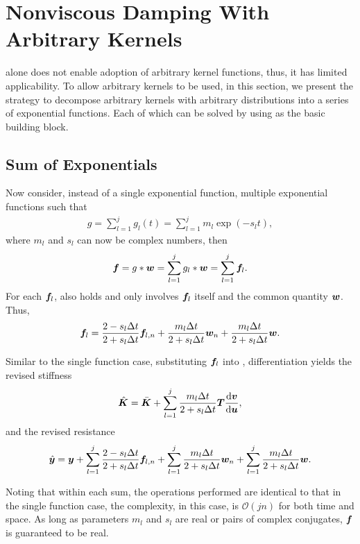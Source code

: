 \section{Nonviscous Damping With Arbitrary Kernels}\label{sec:arbitrary}
 alone does not enable adoption of arbitrary kernel functions, thus, it has limited applicability. To allow arbitrary kernels to be used, in this section, we present the strategy to decompose arbitrary kernels with arbitrary distributions into a series of exponential functions. Each of which can be solved by using  as the basic building block.
\subsection{Sum of Exponentials}
Now consider, instead of a single exponential function, multiple exponential functions such that
\begin{gather}\label{eq:sum_exp}
g=\sum_{l=1}^{j}g_l\left(t\right)=\sum_{l=1}^{j}m_l\exp\left(-s_lt\right),
\end{gather}
where $m_l$ and $s_l$ can now be complex numbers, then
\begin{gather}\label{eq:sum_conv}
\bm{f}=g*\bm{w}=\sum_{l=1}^{j}g_l*\bm{w}=\sum_{l=1}^{j}\bm{f}_l.
\end{gather}
For each $\bm{f}_l$,  also holds and only involves $\bm{f}_l$ itself and the common quantity $\bm{w}$. Thus,
\begin{gather}
\bm{f}_l=\dfrac{2-s_l\Delta{}t}{2+s_l\Delta{}t}\bm{f}_{l,n}+\dfrac{m_l\Delta{}t}{2+s_l\Delta{}t}\bm{w}_n+\dfrac{m_l\Delta{}t}{2+s_l\Delta{}t}\bm{w}.
\end{gather}

Similar to the single function case, substituting $\bm{f}_l$ into , differentiation yields the revised stiffness
\begin{gather}\label{eq:revised_k_multi}
\hat{\bm{K}}=\bar{\bm{K}}+\sum_{l=1}^{j}\dfrac{m_l\Delta{}t}{2+s_l\Delta{}t}\bm{T}\dfrac{\mathrm{d}\bm{v}}{\mathrm{d}\bm{u}},
\end{gather}
and the revised resistance
\begin{gather}\label{eq:revised_y_multi}
\hat{\bm{y}}=\bm{y}+\sum_{l=1}^{j}\dfrac{2-s_l\Delta{}t}{2+s_l\Delta{}t}\bm{f}_{l,n}+\sum_{l=1}^{j}\dfrac{m_l\Delta{}t}{2+s_l\Delta{}t}\bm{w}_n+\sum_{l=1}^{j}\dfrac{m_l\Delta{}t}{2+s_l\Delta{}t}\bm{w}.
\end{gather}

Noting that within each sum, the operations performed are identical to that in the single function case, the complexity, in this case, is $\mathcal{O}\left(jn\right)$ for both time and space. As long as parameters $m_l$ and $s_l$ are real or pairs of complex conjugates, $\bm{f}$ is guaranteed to be real.
